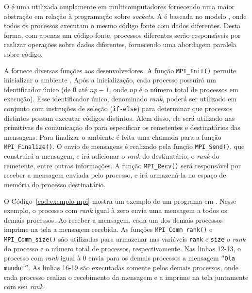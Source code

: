 O \mpi é uma \api utilizada amplamente em multicomputadores fornecendo uma maior
abstração em relação à programação sobre \textit{sockets}. A \api é baseada no
modelo \spmd, onde todos os processos executam o mesmo código fonte com
dados diferentes. Desta forma, com apenas um código fonte, processos diferentes
serão responsáveis por realizar operações sobre dados diferentes, fornecendo uma abordagem
paralela sobre código.

A \api fornece diversas funções aos desenvolvedores. A função \texttt{MPI\_Init()} permite inicializar o ambiente \mpi.
Após a inicialização, cada processo \mpi possuirá um identificador único (de $0$ até $np-1$, onde $np$ é o número total
de processos \mpi em execução). Esse identificador único, denominado \textit{rank}, poderá ser utilizado em conjunto com
instruções de seleção (\texttt{if-else}) para determinar que processos \mpi distintos possam executar códigos distintos. Alem disso,
ele será utilizado nas primitivas de comunicação do \mpi para especificar os remetentes e destinatários das mensagens.
Para finalizar o ambiente \mpi é feita uma chamada para a função \texttt{MPI\_Finalize()}. O envio de mensagens
é realizado pela função \texttt{MPI\_Send()}, que construirá a mensagem, e irá
adicionar o \textit{rank} do destinatário, o \textit{rank} do remetente, entre
outras informações. A função \texttt{MPI\_Recv()} será responsável por receber a
mensagem enviada pelo processo, e irá armazená-la no espaço de memória
do processo destinatário.

O Código~\ref{cod:exemplo-mpi} mostra um exemplo de um programa em \mpi. Nesse exemplo, o processo com \textit{rank} igual à zero
envia uma mensagem a todos os demais processos. Ao receber a mensagem, cada um dos demais processos imprime na tela a mensagem
recebida. As funções \texttt{MPI\_Comm\_rank()} e \texttt{MPI\_Comm\_size()} são utilizadas para armazenar nas variáveis \texttt{rank} e \texttt{size}
o \textit{rank} do processo e o número total de processos, respectivamente. Nas linhas 12-13, o processo com \textit{rank} igual à 0 envia para os
demais processos a mensagem \texttt{``Ola mundo!''}. As linhas 16-19 são executadas somente pelos demais processos, onde cada processo
realiza o recebimento da mensagem e a imprime na tela juntamente com seu \textit{rank}.

